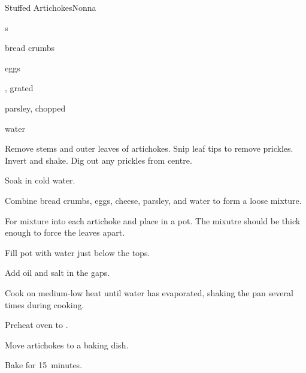 \begin{recipe}{Stuffed Artichokes}{Nonna}{}

\begin{ingredients}
\item {}s
\item bread crumbs
\item eggs
\item {}, grated
\item parsley, chopped
\item water
\end{ingredients}

\begin{directions}
\item Remove stems and outer leaves of artichokes. Snip leaf tips to remove prickles. Invert and shake. Dig out any prickles from centre.
\item Soak in cold water.
\item Combine bread crumbs, eggs, cheese, parsley, and water to form a loose mixture.
\item For mixture into each artichoke and place in a pot. The mixutre should be thick enough to force the leaves apart.
\item Fill pot with water just below the tops.
\item Add oil and salt in the gaps.
\item Cook on medium-low heat until water has evaporated, shaking the pan several times during cooking.
\item Preheat oven to .
\item Move artichokes to a baking dish.
\item Bake for 15~minutes.
\end{directions}

\end{recipe}
